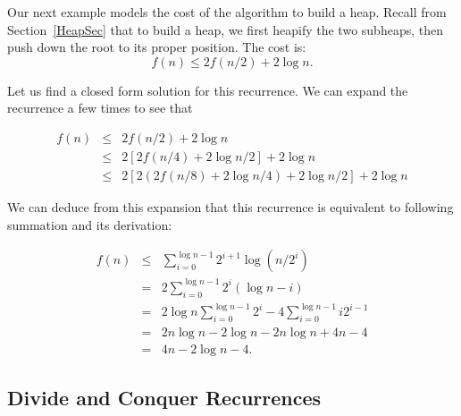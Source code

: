 \begin{example}
Our next example models the cost of the algorithm to build a heap.
Recall from Section~\ref{HeapSec} that to build a heap, we first heapify
the two subheaps, then push down the root to its proper position.
The cost is:
\[f(n) \leq 2f(n/2) + 2 \log n.\]

Let us find a closed form solution for this recurrence.
We can expand the recurrence a few times to see that

\begin{eqnarray*}
f(n) &\leq& 2f(n/2) + 2 \log n\\
&\leq& 2[2f(n/4) + 2 \log n/2] + 2 \log n\\
&\leq& 2[2(2f(n/8) + 2 \log n/4) + 2 \log n/2] + 2 \log n
\end{eqnarray*}

We can deduce from this expansion that this recurrence is equivalent
to following summation and its derivation:

\begin{eqnarray*}
f(n) &\leq& \sum_{i=0}^{\log n -1} 2^{i+1} \log(n/2^i)\\
&=& 2 \sum_{i=0}^{\log n -1} 2^i (\log n - i)\\
&=& 2 \log n \sum_{i=0}^{\log n -1} 2^i - 4 \sum_{i=0}^{\log n -1} i 2^{i-1}\\
&=& 2 n \log n - 2 \log n - 2 n \log n + 4n -4\\
&=& 4n - 2 \log n - 4.
\end{eqnarray*}
\end{example}


\subsection{Divide and Conquer Recurrences}

